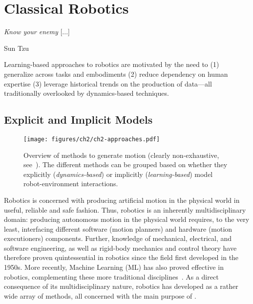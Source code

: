 \section{Classical Robotics}
\label{sec:classical}

\epigraph{\textit{Know your enemy} [...]}{Sun Tzu}

\begin{tldr}
Learning-based approaches to robotics are motivated by the need to (1) generalize across tasks and embodiments (2) reduce dependency on human expertise (3) leverage historical trends on the production of data---all traditionally overlooked by dynamics-based techniques.
\end{tldr}

\subsection{Explicit and Implicit Models}

\begin{figure}
    \centering
    \texttt{[image: figures/ch2/ch2-approaches.pdf]}
    \caption{Overview of methods to generate motion (clearly non-exhaustive, see~\citet{bekrisStateRobotMotion2024}). The different methods can be grouped based on whether they explicitly (\emph{dynamics-based}) or implicitly (\emph{learning-based}) model robot-environment interactions.}
    \label{fig:generating-motion-atlas}
\end{figure}

Robotics is concerned with producing artificial motion in the physical world in useful, reliable and safe fashion.
Thus, robotics is an inherently multidisciplinary domain: producing autonomous motion in the physical world requires, to the very least, interfacing different software (motion planners) and hardware (motion executioners) components.
Further, knowledge of mechanical, electrical, and software engineering, as well as rigid-body mechanics and control theory have therefore proven quintessential in robotics since the field first developed in the 1950s.
More recently, Machine Learning (ML) has also proved effective in robotics, complementing these more traditional disciplines~\citep{connellRobotLearning1993}.
As a direct consequence of its multidisciplinary nature, robotics has developed as a rather wide array of methods, all concerned with the main purpose of .

